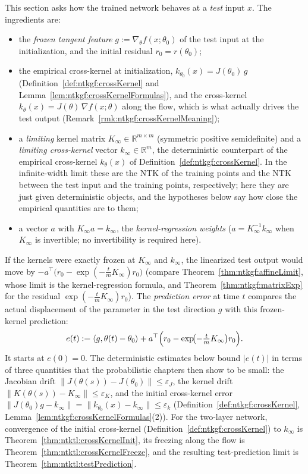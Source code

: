 This section asks how the trained network behaves at a \emph{test} input $x$. The ingredients are:
\begin{itemize}
  \item the \emph{frozen tangent feature} $g:=\nabla_\theta f(x;\theta_0)$ of the test input at the initialization, and the initial residual $r_0=r(\theta_0)$;
  \item the empirical cross-kernel at initialization, $k_{\theta_0}(x)=J(\theta_0)\,g$ (Definition~\ref{def:ntkgf:crossKernel} and Lemma~\ref{lem:ntkgf:crossKernelFormulas}), and the cross-kernel $k_\theta(x)=J(\theta)\,\nabla f(x;\theta)$ along the flow, which is what actually drives the test output (Remark~\ref{rmk:ntkgf:crossKernelMeaning});
  \item a \emph{limiting} kernel matrix $K_\infty\in\mathbb R^{m\times m}$ (symmetric positive semidefinite) and a \emph{limiting cross-kernel} vector $k_\infty\in\mathbb R^m$, the deterministic counterpart of the empirical cross-kernel $k_\theta(x)$ of Definition~\ref{def:ntkgf:crossKernel}. In the infinite-width limit these are the NTK of the training points and the NTK between the test input and the training points, respectively; here they are just given deterministic objects, and the hypotheses below say how close the empirical quantities are to them;
  \item a vector $a$ with $K_\infty a=k_\infty$, the \emph{kernel-regression weights} ($a=K_\infty^{-1}k_\infty$ when $K_\infty$ is invertible; no invertibility is required here).
\end{itemize}
If the kernels were exactly frozen at $K_\infty$ and $k_\infty$, the linearized test output would move by $-a^\top\bigl(r_0-\exp(-\frac tmK_\infty)r_0\bigr)$ (compare Theorem~\ref{thm:ntkgf:affineLimit}, whose limit is the kernel-regression formula, and Theorem~\ref{thm:ntkgf:matrixExp} for the residual $\exp(-\frac tmK_\infty)r_0$). The \emph{prediction error} at time $t$ compares the actual displacement of the parameter in the test direction $g$ with this frozen-kernel prediction:
\[
  e(t):=\langle g,\theta(t)-\theta_0\rangle+a^\top\Bigl(r_0-\exp\!\bigl(-\tfrac tmK_\infty\bigr)r_0\Bigr).
\]
It starts at $e(0)=0$. The deterministic estimates below bound $|e(t)|$ in terms of three quantities that the probabilistic chapters then show to be small: the Jacobian drift $\|J(\theta(s))-J(\theta_0)\|\le\varepsilon_J$, the kernel drift $\|K(\theta(s))-K_\infty\|\le\varepsilon_K$, and the initial cross-kernel error $\|J(\theta_0)g-k_\infty\|=\|k_{\theta_0}(x)-k_\infty\|\le\varepsilon_k$ (Definition~\ref{def:ntkgf:crossKernel}, Lemma~\ref{lem:ntkgf:crossKernelFormulas}(2)).
For the two-layer network, convergence of the initial cross-kernel (Definition~\ref{def:ntkgf:crossKernel}) to $k_\infty$ is Theorem~\ref{thm:ntktl:crossKernelInit}, its freezing along the flow is Theorem~\ref{thm:ntktl:crossKernelFreeze}, and the resulting test-prediction limit is Theorem~\ref{thm:ntktl:testPrediction}.

